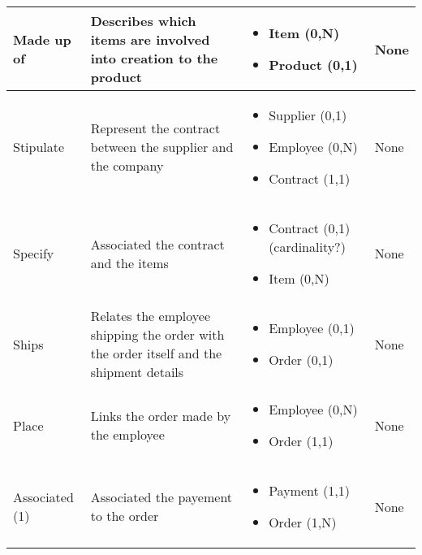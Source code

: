 \begin{longtable}{|p{}|p{} |p{}|p{} |}
Made up of & Describes which items are involved into creation to the product & \begin{itemize}
	\vspace{-1em}
	\item Item (0,N)
	\item Product (0,1)
\end{itemize}
&  None \\\hline

Stipulate & Represent the contract between the supplier and the company  & \begin{itemize}
	\vspace{-1em}
	\item Supplier (0,1) 
	\item Employee (0,N)
    \item Contract  (1,1)
	\end{itemize}
&  None\\\hline

Specify & Associated the contract and the items  & \begin{itemize}
	\vspace{-1em}
	\item Contract (0,1) (cardinality?) 
	\item Item    (0,N)
	\end{itemize}
&  None\\\hline


Ships & Relates the employee shipping the order with the order itself and the shipment details & \begin{itemize}
	\vspace{-1em}
	\item Employee (0,1)
	\item Order (0,1)
\end{itemize}
&  None \\\hline

Place & Links the order made by the employee & \begin{itemize}
	\vspace{-1em}
	\item Employee (0,N)
	\item Order  (1,1)
\end{itemize}
&  None \\\hline

Associated (1) & Associated the payement to the order & \begin{itemize}
	\vspace{-1em}
	\item Payment (1,1)
	\item Order  (1,N)
\end{itemize}
&  None \\\hline


\end{longtable}
